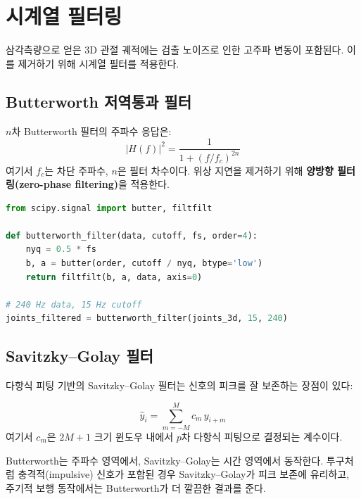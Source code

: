 \documentclass[11pt, a4paper]{report}
\begin{document}
\section{시계열 필터링}

삼각측량으로 얻은 3D 관절 궤적에는 검출 노이즈로 인한 고주파 변동이 포함된다.
이를 제거하기 위해 시계열 필터를 적용한다.

\subsection{Butterworth 저역통과 필터}

$n$차 Butterworth 필터의 주파수 응답은:
\begin{equation}
  |H(f)|^2 = \frac{1}{1 + (f / f_c)^{2n}}
\end{equation}
여기서 $f_c$는 차단 주파수, $n$은 필터 차수이다.
위상 지연을 제거하기 위해 \textbf{양방향 필터링(zero-phase filtering)}을 적용한다.

\begin{codebox}[title={양방향 Butterworth 필터}]
\begin{lstlisting}[language=Python]
from scipy.signal import butter, filtfilt

def butterworth_filter(data, cutoff, fs, order=4):
    nyq = 0.5 * fs
    b, a = butter(order, cutoff / nyq, btype='low')
    return filtfilt(b, a, data, axis=0)

# 240 Hz data, 15 Hz cutoff
joints_filtered = butterworth_filter(joints_3d, 15, 240)
\end{lstlisting}
\end{codebox}

\subsection{Savitzky--Golay 필터}

다항식 피팅 기반의 Savitzky--Golay 필터는 신호의 피크를 잘 보존하는 장점이 있다:

\begin{equation}
  \hat{y}_i = \sum_{m=-M}^{M} c_m \, y_{i+m}
\end{equation}
여기서 $c_m$은 $2M+1$ 크기 윈도우 내에서 $p$차 다항식 피팅으로 결정되는 계수이다.

\begin{keyidea}
Butterworth는 주파수 영역에서, Savitzky--Golay는 시간 영역에서 동작한다.
투구처럼 충격적(impulsive) 신호가 포함된 경우 Savitzky--Golay가 피크 보존에 유리하고,
주기적 보행 동작에서는 Butterworth가 더 깔끔한 결과를 준다.
\end{keyidea}
\end{document}
